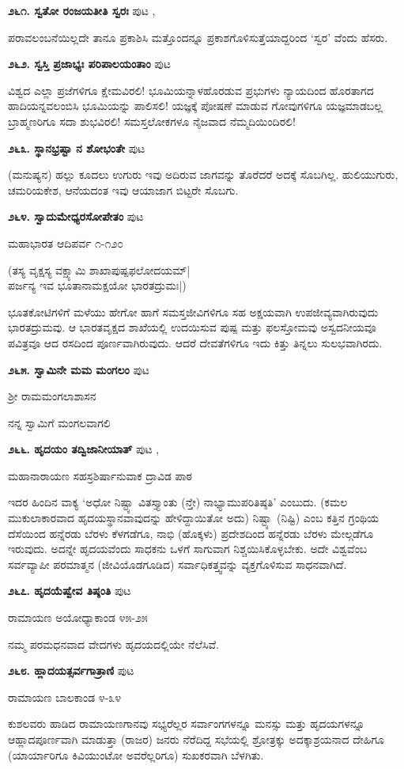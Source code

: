 \medskip
\noindent\textbf{೨೬೧. ಸ್ವತೋ ರಂಜಯತೀತಿ ಸ್ವರಃ} \hfill ಪುಟ \pageref{11},\pageref{17}

\hfill ಪರಾವಲಂಬನೆಯಿಲ್ಲದೇ ತಾನೂ ಪ್ರಕಾಶಿಸಿ ಮತ್ತೊಂದನ್ನೂ ಪ್ರಕಾಶಗೊಳಿಸುತ್ತೆಯಾದ್ದರಿಂದ `ಸ್ವರ' ವೆಂದು ಹೆಸರು.

\medskip
\noindent\textbf{೨೬೨. ಸ್ವಸ್ತಿ ಪ್ರಜಾಭ್ಯಃ ಪರಿಪಾಲಯಂತಾಂ} \hfill ಪುಟ \pageref{149}

\hfill ವಿಶ್ವದ ಎಲ್ಲಾ ಪ್ರಜೆಗಳಿಗೂ ಕ್ಷೇಮವಿರಲಿ! ಭೂಮಿಯನ್ನಾಳಹೊರಡುವ ಪ್ರಭುಗಳು ನ್ಯಾಯದಿಂದ ಹೊರತಾಗದ ಹಾದಿಯನ್ನವಲಂಬಿಸಿ ಭೂಮಿಯನ್ನು ಪಾಲಿಸಲಿ! ಯಜ್ಞಕ್ಕೆ ಪೋಷಣೆ ಮಾಡುವ ಗೋವುಗಳಿಗೂ ಯಜ್ಞಮಾಡಬಲ್ಲ ಬ್ರಾಹ್ಮಣರಿಗೂ ಸದಾ ಶುಭವಿರಲಿ! ಸಮಸ್ತಲೋಕಗಳೂ ನೈಜವಾದ ನೆಮ್ಮದಿಯಿಂದಿರಲಿ!

\medskip
\noindent\textbf{೨೬೩. ಸ್ಥಾನಭ್ರಷ್ಟಾ ನ ಶೋಭಂತೇ} \hfill ಪುಟ \pageref{48}

\hfill (ಮನುಷ್ಯನ) ಹಲ್ಲು ಕೂದಲು ಉಗುರು ಇವು ಅದಿರುವ ಜಾಗವನ್ನು ತೊರೆದರೆ ಅದಕ್ಕೆ ಸೊಬಗಿಲ್ಲ. ಹುಲಿಯುಗುರು, ಚಮರಿಯಕೇಶ, ಆನೆಯದಂತ ಇವು ಆಯಾಜಾಗ ಬಿಟ್ಟರೇ ಸೊಬಗು.

\medskip
\noindent\textbf{೨೬೪. ಸ್ವಾದುಮೇಧ್ಯರಸೋಪೇತಂ} \hfill ಪುಟ \pageref{119}

\hfill ಮಹಾಭಾರತ ಆದಿಪರ್ವ ೧-೧೨೦

\begin{shloka}
(ತಸ್ಯ ವೃಕ್ಷಸ್ಯ ವಕ್ಷ್ಯಾಮಿ ಶಾಖಾಪುಷ್ಪಫಲೋದಯಮ್|\\
ಪರ್ಜನ್ಯ ಇವ ಭೂತಾನಾಮಕ್ಷಯೋ ಭಾರತದ್ರುಮಃ|)
\end{shloka}

ಭೂತಕೋಟಿಗಳಿಗೆ ಮಳೆಯು ಹೇಗೋ ಹಾಗೆ ಸಮಸ್ತಜೀವಿಗಳಿಗೂ ಸಹ ಅಕ್ಷಯವಾಗಿ ಉಪಜೀವ್ಯವಾಗಿರುವುದು ಭಾರತದ್ರುಮವು. ಆ ಭಾರತವೃಕ್ಷದ ಶಾಖೆಯಲ್ಲಿ ಉದಯಿಸುವ ಪುಷ್ಪ ಮತ್ತು ಫಲಸ್ತೋಮವು ಅಸ್ವದನೀಯವೂ ಪವಿತ್ರವೂ ಆದ ರಸದಿಂದ ಪೂರ್ಣವಾಗಿರುವುದು. ಆದರೆ ದೇವತೆಗಳಿಗೂ ಇದು ಕಿತ್ತು ತಿನ್ನಲು ಸುಲಭವಾಗಿರದು.

\medskip
\noindent\textbf{೨೬೫. ಸ್ವಾಮಿನೇ ಮಮ ಮಂಗಲಂ} \hfill ಪುಟ \pageref{234}

\hfill ಶ್ರೀ ರಾಮಮಂಗಲಾಶಾಸನ

ನನ್ನ ಸ್ವಾಮಿಗೆ ಮಂಗಲವಾಗಲಿ

\medskip
\noindent\textbf{೨೬೬. ಹೃದಯಂ ತದ್ವಿಜಾನೀಯಾತ್} \hfill ಪುಟ \pageref{27},\pageref{249}

\hfill ಮಹಾನಾರಾಯಣ ಸಹಸ್ರಶಿರ್ಷಾನುವಾಕ ದ್ರಾವಿಡ ಪಾಠ

ಇದರ ಹಿಂದಿನ ವಾಕ್ಯ `ಅಧೋ ನಿಷ್ಟ್ಯಾ ವಿತಸ್ತ್ಯಾಂತು (ನ್ತೇ) ನಾಭ್ಯಾಮುಪರಿತಿಷ್ಠತಿ' ಎಂಬುದು. (ಕಮಲ ಮುಕುಲಾಕಾರವಾದ ಹೃದಯಸ್ಥಾನವಾವುದನ್ನು ಹೇಳಿದ್ದಾಯಿತೋ ಅದು) ನಿಷ್ಟ್ಯಾ (ನಿಷ್ಟಿ) ಎಂಬ ಕತ್ತಿನ ಗ್ರಂಥಿಯ ದೆಸೆಯಿಂದ ಹನ್ನೆರಡು ಬೆರಳು ಕೆಳಗಡೆಗೂ, ನಾಭಿ (ಹೊಕ್ಕಳು) ಪ್ರದೇಶದಿಂದ ಹನ್ನೆರಡು ಬೆರಳು ಮೇಲ್ಗಡೆಗೂ ಇರುವುದು. ಅದನ್ನೇ ಹೃದಯವೆಂದು ಸಾಧಕನು ಒಳಗೆ ಸಾಗುವಾಗ ನಿಶ್ಚಯಿಸಿಕೊಳ್ಳಬೇಕು. ಅದೇ ವಿಶ್ವವೆಂಬ ಸರ್ವವ್ಯಾಪೀ ಪರಮಾತ್ಮನ (ಜೀವಿಯೊಡಗೂಡಿದ) ಸರ್ವಾಧಿಕತ್ತ್ವವನ್ನು ವ್ಯಕ್ತಗೊಳಿಸುವ ಸಾಧನವಾಗಿದೆ.

\medskip
\noindent\textbf{೨೬೭. ಹೃದಯೆಷ್ವೇವ ತಿಷ್ಠಂತಿ} \hfill ಪುಟ \pageref{162}

\hfill ರಾಮಾಯಣ ಅಯೋಧ್ಯಾಕಾಂಡ ೪೫-೨೫

ನಮ್ಮ ಪರಮಧನವಾದ ವೇದಗಳು ಹೃದಯದಲ್ಲಿಯೇ ನೆಲೆಸಿವೆ.

\medskip
\noindent\textbf{೨೬೮. ಹ್ಲಾದಯತ್ಸರ್ವಗಾತ್ರಾಣಿ} \hfill ಪುಟ \pageref{189}

\hfill ರಾಮಾಯಣ ಬಾಲಕಾಂಡ ೪-೩೪

ಕುಶಲವರು ಹಾಡಿದ ರಾಮಾಯಣಗಾನವು ಸಭ್ಯರೆಲ್ಲರ ಸರ್ವಾಂಗಗಳನ್ನೂ ಮನಸ್ಸು ಮತ್ತು ಹೃದಯಗಳನ್ನೂ ಆಹ್ಲಾದಪೂರ್ಣವಾಗಿ ಮಾಡುತ್ತಾ (ರಾಜರ) ಜನರು ನೆರೆದಿದ್ದ ಸಭೆಯಲ್ಲಿ ಶ್ರೋತ್ರಕ್ಕು ಅದಕ್ಕಾಶ್ರಯನಾದ ದೇಹಿಗೂ (ಯಾರ್ಯಾರಿಗೂ ಕಿವಿಯುಂಟೋ ಅವರೆಲ್ಲರಿಗೂ) ಸುಖಕರವಾಗಿ ಬೆಳಗಿತು.

